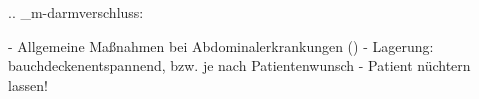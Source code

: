 %

.. _m-darmverschluss:

%
%
\begin{itemize}
  -   Allgemeine Maßnahmen bei Abdominalerkrankungen
  ()
  -   Lagerung: bauchdeckenentspannend, bzw. je nach
  Patientenwunsch
  -   Patient nüchtern lassen!
\end{itemize}